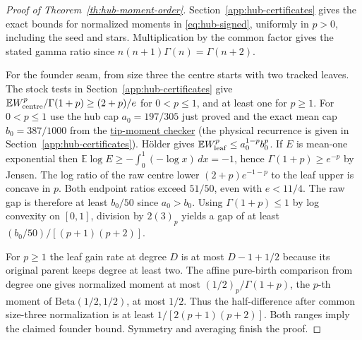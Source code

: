 \documentclass[11pt]{article}
\newcommand{\proofsrc}[2]{\href{https://github.com/uzay-eth/friend-tree-exponent/blob/a0972085ad72ad5685ae7b424988648d1965e73c/#1}{#2}}
\theoremstyle{remark}
\numberwithin{equation}{section}
\newcommand{\E}{\mathbb E}
\begin{document}
\begin{proof}[Proof of Theorem~\ref{th:hub-moment-order}]
Section~\ref{app:hub-certificates} gives the exact bounds for normalized moments in \eqref{eq:hub-signed}, uniformly in $p>0$, including the seed and stars. Multiplication by the common factor gives the stated gamma ratio since $n(n+1)\Gamma(n)=\Gamma(n+2)$.

For the founder seam, from size three the centre starts with two tracked leaves. The stock tests in Section~\ref{app:hub-certificates} give $\E W_{\rm centre}^p/\Gamma(1+p)\ge(2+p)/e$ for $0<p\le1$, and at least one for $p\ge1$. For $0<p\le1$ use the hub cap $a_0=197/305$ just proved and the exact mean cap $b_0=387/1000$ from the \proofsrc{round2/proofs/astra-late/source/round2/open/age-order/hub-ranking/tip-moments/check.py}{tip-moment checker} (the physical recurrence is given in Section~\ref{app:hub-certificates}). H\"older gives $\E W_{\rm leaf}^p\le a_0^{1-p}b_0^p$. If $E$ is mean-one exponential then $\E\log E\ge-\int_0^1(-\log x)\,dx=-1$, hence $\Gamma(1+p)\ge e^{-p}$ by Jensen. The log ratio of the raw centre lower $(2+p)e^{-1-p}$ to the leaf upper is concave in $p$. Both endpoint ratios exceed $51/50$, even with $e<11/4$. The raw gap is therefore at least $b_0/50$ since $a_0>b_0$. Using $\Gamma(1+p)\le1$ by log convexity on $[0,1]$, division by $2(3)_p$ yields a gap of at least $(b_0/50)/[(p+1)(p+2)]$.

For $p\ge1$ the leaf gain rate at degree $D$ is at most $D-1+1/2$ because its original parent keeps degree at least two. The affine pure-birth comparison from degree one gives normalized moment at most $(1/2)_p/\Gamma(1+p)$, the $p$-th moment of $\mathrm{Beta}(1/2,1/2)$, at most $1/2$. Thus the half-difference after common size-three normalization is at least $1/[2(p+1)(p+2)]$. Both ranges imply the claimed founder bound. Symmetry and averaging finish the proof.
\end{proof}
\end{document}
